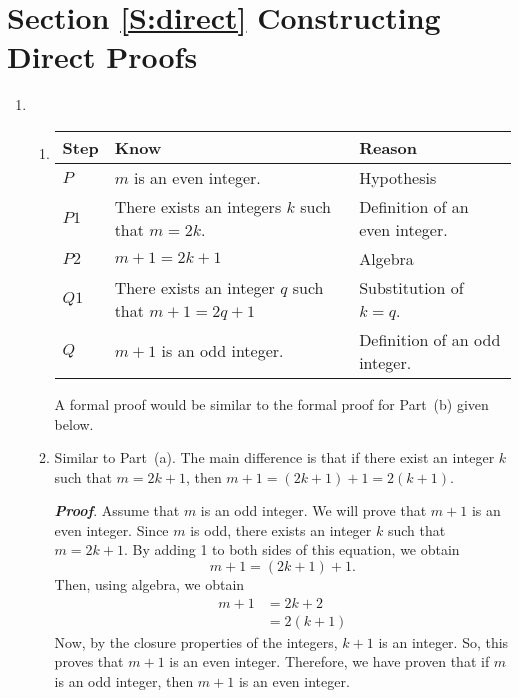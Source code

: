 \section*{Section \ref{S:direct} Constructing Direct Proofs}

\begin{enumerate}
\item \begin{enumerate}  \item 
\begin{tabular}[t]{|p{0.4in}|p{1.6in}|p{1.6in}|}
  \hline
  \textbf{Step}  &  \textbf{Know}  &  \textbf{Reason} \\ \hline
  $P$  &  $m$ is an even integer.  &  Hypothesis \\ \hline
  $P1$ &  There exists an integers $k$ such that $m = 2k$. &  Definition of an even integer. \\ \hline
  $P2$  &  $m + 1 = 2k + 1$  &  Algebra \\ \hline
  $Q1$  &  There exists an integer $q$ such that $m +1 = 2q+1$  &  Substitution of $k = q$. \\ \hline
  $Q$  &  $m + 1$ is an odd integer. &  Definition of an odd integer. \\ \hline
\end{tabular}

A formal proof would be similar to the formal proof for Part~(b) given below.

\item Similar to Part~(a).  The main difference is that if there exist an integer $k$ such that $m = 2k + 1$, then $m + 1 = \left(2k + 1 \right) + 1 = 2 \left( k + 1 \right)$.

\noindent
\emph{\textbf{Proof}}.  Assume that $m$ is an odd integer.  We will prove that $m + 1$ is an even integer.  Since 
$m$ is odd, there exists an integer $k$ such that $m = 2k + 1$.  By adding 1 to both sides of this equation, we obtain
\[
m + 1 = \left( 2k + 1 \right) + 1.
\]
Then, using algebra, we obtain
\[
\begin{aligned}
m + 1 &= 2k + 2 \\
      &= 2 \left( k + 1 \right)
\end{aligned}
\]
Now, by the closure properties of the integers, $k + 1$ is an integer.  So, this proves that 
$m + 1$ is an even integer.  Therefore, we have proven that if $m$ is an odd integer, then 
$m + 1$ is an even integer.
\end{enumerate}
\end{enumerate}



